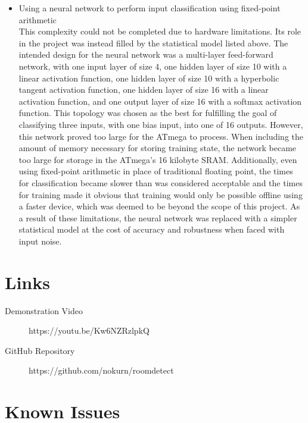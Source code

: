 \documentclass{article}
\begin{document}
\begin{itemize}

  \item Using a neural network to perform input classification using
    fixed-point arithmetic \\
    This complexity could not be completed due to hardware limitations.
    Its role in the project was instead filled by the statistical model
    listed above.  The intended design for the neural network was a
    multi-layer feed-forward network, with one input layer of size 4,
    one hidden layer of size 10 with a linear activation function, one
    hidden layer of size 10 with a hyperbolic tangent activation
    function, one hidden layer of size 16 with a linear activation
    function, and one output layer of size 16 with a softmax activation
    function.  This topology was chosen as the best for fulfilling the
    goal of classifying three inputs, with one bias input, into one of
    16 outputs.  However, this network proved too large for the ATmega
    to process.  When including the amount of memory necessary for
    storing training state, the network became too large for storage in
    the ATmega's 16 kilobyte SRAM.  Additionally, even using fixed-point
    arithmetic in place of traditional floating point, the times for
    classification became slower than was considered acceptable and the
    times for training made it obvious that training would only be
    possible offline using a faster device, which was deemed to be
    beyond the scope of this project.  As a result of these limitations,
    the neural network was replaced with a simpler statistical model at
    the cost of accuracy and robustness when faced with input noise.

\end{itemize}

\section{Links}

\begin{description}

  \item [Demonstration Video] https://youtu.be/Kw6NZRzlpkQ

  \item [GitHub Repository] https://github.com/nokurn/roomdetect

\end{description}

\section{Known Issues}
\end{document}
